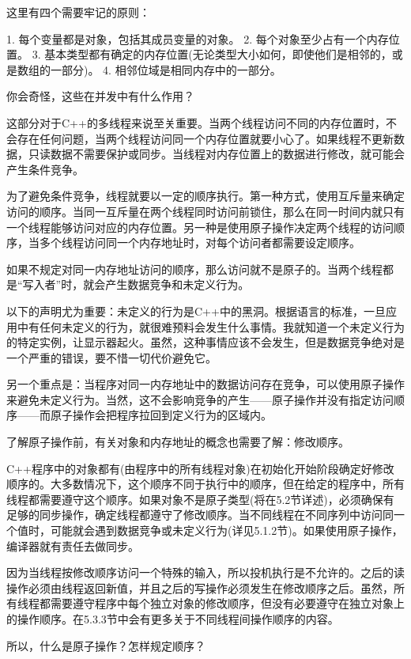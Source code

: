 这里有四个需要牢记的原则：

1. 每个变量都是对象，包括其成员变量的对象。
2. 每个对象至少占有一个内存位置。
3. 基本类型都有确定的内存位置(无论类型大小如何，即使他们是相邻的，或是数组的一部分)。
4. 相邻位域是相同内存中的一部分。

你会奇怪，这些在并发中有什么作用？


这部分对于C++的多线程来说至关重要。当两个线程访问不同的内存位置时，不会存在任何问题，当两个线程访问同一个内存位置就要小心了。如果线程不更新数据，只读数据不需要保护或同步。当线程对内存位置上的数据进行修改，就可能会产生条件竞争。

为了避免条件竞争，线程就要以一定的顺序执行。第一种方式，使用互斥量来确定访问的顺序。当同一互斥量在两个线程同时访问前锁住，那么在同一时间内就只有一个线程能够访问对应的内存位置。另一种是使用原子操作决定两个线程的访问顺序，当多个线程访问同一个内存地址时，对每个访问者都需要设定顺序。

如果不规定对同一内存地址访问的顺序，那么访问就不是原子的。当两个线程都是“写入者”时，就会产生数据竞争和未定义行为。

以下的声明尤为重要：未定义的行为是C++中的黑洞。根据语言的标准，一旦应用中有任何未定义的行为，就很难预料会发生什么事情。我就知道一个未定义行为的特定实例，让显示器起火。虽然，这种事情应该不会发生，但是数据竞争绝对是一个严重的错误，要不惜一切代价避免它。

另一个重点是：当程序对同一内存地址中的数据访问存在竞争，可以使用原子操作来避免未定义行为。当然，这不会影响竞争的产生——原子操作并没有指定访问顺序——而原子操作会把程序拉回到定义行为的区域内。

了解原子操作前，有关对象和内存地址的概念也需要了解：修改顺序。


C++程序中的对象都有(由程序中的所有线程对象)在初始化开始阶段确定好修改顺序的。大多数情况下，这个顺序不同于执行中的顺序，但在给定的程序中，所有线程都需要遵守这个顺序。如果对象不是原子类型(将在5.2节详述)，必须确保有足够的同步操作，确定线程都遵守了修改顺序。当不同线程在不同序列中访问同一个值时，可能就会遇到数据竞争或未定义行为(详见5.1.2节)。如果使用原子操作，编译器就有责任去做同步。

因为当线程按修改顺序访问一个特殊的输入，所以投机执行是不允许的。之后的读操作必须由线程返回新值，并且之后的写操作必须发生在修改顺序之后。虽然，所有线程都需要遵守程序中每个独立对象的修改顺序，但没有必要遵守在独立对象上的操作顺序。在5.3.3节中会有更多关于不同线程间操作顺序的内容。

所以，什么是原子操作？怎样规定顺序？

